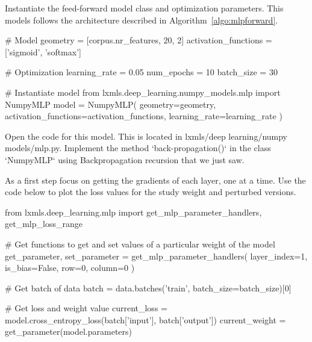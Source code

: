 \begin{exercise}
Instantiate the feed-forward model class and optimization parameters. This models follows the architecture described in Algorithm~\ref{algo:mlpforward}.
\begin{python}
# Model
geometry = [corpus.nr_features, 20, 2]
activation_functions = ['sigmoid', 'softmax']

# Optimization
learning_rate = 0.05
num_epochs = 10
batch_size = 30

# Instantiate model
from lxmls.deep_learning.numpy_models.mlp import NumpyMLP
model = NumpyMLP(
    geometry=geometry,
    activation_functions=activation_functions,
    learning_rate=learning_rate
)
\end{python}
Open the code for this model. This is located in lxmls/deep learning/numpy
models/mlp.py. Implement the method `back-propagation()` in the class
`NumpyMLP` using Backpropagation recursion that we just saw.

As a first step focus on getting the gradients of each layer, one at a time.
Use the code below to plot the loss values for the study weight and perturbed
versions. 
\begin{python}
from lxmls.deep_learning.mlp import get_mlp_parameter_handlers, get_mlp_loss_range

# Get functions to get and set values of a particular weight of the model
get_parameter, set_parameter = get_mlp_parameter_handlers(
    layer_index=1,
    is_bias=False,
    row=0, 
    column=0
)

# Get batch of data
batch = data.batches('train', batch_size=batch_size)[0]

# Get loss and weight value
current_loss = model.cross_entropy_loss(batch['input'], batch['output'])
current_weight = get_parameter(model.parameters)


\end{python}
\end{exercise}
